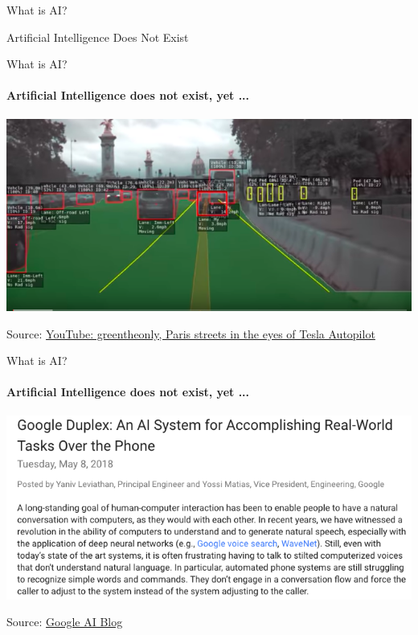 \begin{frame}[c]{What is AI?}
  \begin{center}
    \huge Artificial Intelligence Does Not Exist
  \end{center}
\end{frame}

\begin{frame}{What is AI?}
  \framesubtitle{Artificial Intelligence does not exist, yet ...}
  \includegraphics[width=\textwidth]{graphics/tesla_paris}

  Source: \href{https://www.youtube.com/watch?v=_1MHGUC_BzQs}{YouTube: greentheonly, Paris streets in the eyes of Tesla Autopilot}
  \end{frame}

  \begin{frame}{What is AI?}
  \framesubtitle{Artificial Intelligence does not exist, yet ...}
  \includegraphics[width=\textwidth]{graphics/google_duplex}

  Source: \href{https://ai.googleblog.com/2018/05/duplex-ai-system-for-natural-conversation.html}{Google AI Blog}
\end{frame}

